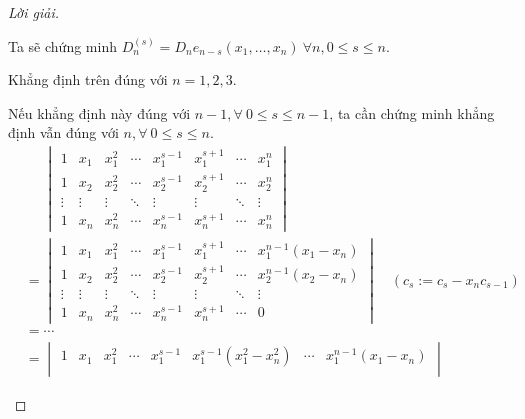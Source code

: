 \documentclass[class=nhvh-linear-algebra,crop=false]{standalone}
\begin{document}
\begin{proof}[Lời giải]
\begin{enumerate}[label = (\alph*)]
              \par Ta sẽ chứng minh $D_{n}^{(s)} = D_{n}e_{n-s}(x_{1},\ldots, x_{n})\ \forall n, 0\le s\le n$.
              \par Khẳng định trên đúng với $n = 1, 2, 3$.
              \par Nếu khẳng định này đúng với $n - 1, \forall\ 0\le s\le n-1$, ta cần chứng minh khẳng định vẫn đúng với $n, \forall\ 0\le s\le n$.
              \begin{align*}
                   & \phantom{=}\begin{vmatrix}
                                    1      & x_{1}  & x_{1}^{2} & \cdots & x_{1}^{s-1} & x_{1}^{s+1} & \cdots & x_{1}^{n} \\
                                    1      & x_{2}  & x_{2}^{2} & \cdots & x_{2}^{s-1} & x_{2}^{s+1} & \cdots & x_{2}^{n} \\
                                    \vdots & \vdots & \vdots    & \ddots & \vdots      & \vdots      & \ddots & \vdots    \\
                                    1      & x_{n}  & x_{n}^{2} & \cdots & x_{n}^{s-1} & x_{n}^{s+1} & \cdots & x_{n}^{n}
                                \end{vmatrix}                                          \\
                   & =
                  \begin{vmatrix}
                      1      & x_{1}  & x_{1}^{2} & \cdots & x_{1}^{s-1} & x_{1}^{s+1} & \cdots & x_{1}^{n-1}(x_{1} - x_{n}) \\
                      1      & x_{2}  & x_{2}^{2} & \cdots & x_{2}^{s-1} & x_{2}^{s+1} & \cdots & x_{2}^{n-1}(x_{2} - x_{n}) \\
                      \vdots & \vdots & \vdots    & \ddots & \vdots      & \vdots      & \ddots & \vdots                     \\
                      1      & x_{n}  & x_{n}^{2} & \cdots & x_{n}^{s-1} & x_{n}^{s+1} & \cdots & 0
                  \end{vmatrix}\quad(c_{s}:=c_{s} - x_{n}c_{s-1})                                       \\
                   & = \cdots                                                                                                                                  \\
                   & =
                  \begin{vmatrix}
                      1      & x_{1}  & x_{1}^{2} & \cdots & x_{1}^{s-1} & x_{1}^{s-1}(x_{1}^{2} - x_{n}^{2}) & \cdots & x_{1}^{n-1}(x_{1} - x_{n}) \\

\end{vmatrix}
\end{align*}
\end{enumerate}
\end{proof}
\end{document}
